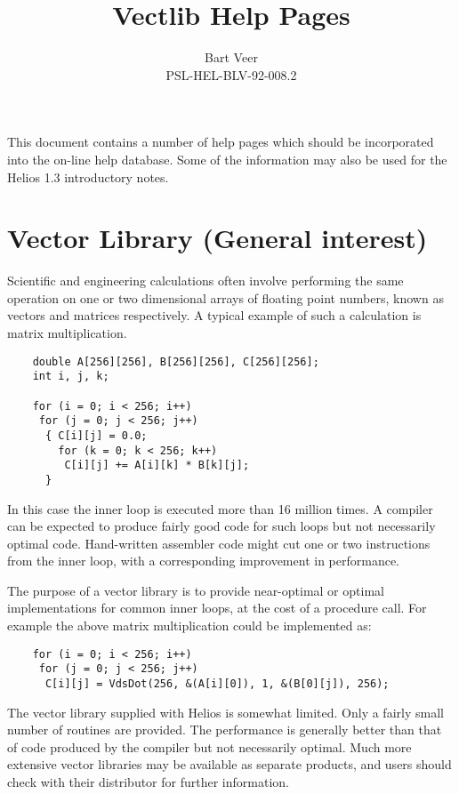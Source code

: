 \title{Vectlib Help Pages}
\author{Bart Veer \\ PSL-HEL-BLV-92-008.2}
\date{}
\newcommand{\helpentry}[1]{\newpage\section{#1}}


\maketitle

This document contains a number of help pages which should be incorporated
into the on-line help database. Some of the information may also be used for
the Helios 1.3 introductory notes.

\helpentry{Vector Library (General interest)}

Scientific and engineering calculations often involve performing the same
operation on one or two dimensional arrays of floating point numbers,
known as vectors and matrices respectively. A typical example of such
a calculation is matrix multiplication.

\begin{verbatim}
    double A[256][256], B[256][256], C[256][256];
    int i, j, k;

    for (i = 0; i < 256; i++)
     for (j = 0; j < 256; j++)
      { C[i][j] = 0.0;
        for (k = 0; k < 256; k++)
         C[i][j] += A[i][k] * B[k][j];
      }
\end{verbatim}

In this case the inner loop is executed more than 16 million times. A compiler
can be expected to produce fairly good code for such loops but not
necessarily optimal code. Hand-written assembler code might cut one or
two instructions from the inner loop, with a corresponding improvement in
performance.

The purpose of a vector library is to provide near-optimal or optimal
implementations for common inner loops, at the cost of a procedure call.
For example the above matrix multiplication could be implemented as:

\begin{verbatim}
    for (i = 0; i < 256; i++)
     for (j = 0; j < 256; j++)
      C[i][j] = VdsDot(256, &(A[i][0]), 1, &(B[0][j]), 256);
\end{verbatim}

The vector library supplied with Helios is somewhat limited. Only a fairly
small number of routines are provided. The performance is generally
better than that of code produced by the compiler but not necessarily
optimal. Much more extensive vector libraries may be available as separate
products, and users should check with their distributor for further
information.

